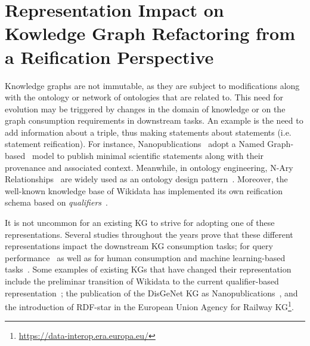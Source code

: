 

\chapter{Representation Impact on Kowledge Graph Refactoring from a Reification Perspective}
\label{chapter:evolution}

Knowledge graphs are not immutable, as they are subject to modifications along with the ontology or network of ontologies that are related to. This need for evolution may be triggered by changes in the domain of knowledge or on the graph consumption requirements in downstream tasks. 
An example is the need to add information about a triple, thus making statements about statements (i.e. statement reification).
For instance, Nanopublications~\parencite{groth2010nanopubs} adopt a Named Graph-based~\parencite{carroll2005namedgraphs} model to publish minimal scientific statements along with their provenance and associated context. Meanwhile, in ontology engineering, N-Ary Relationships~\parencite{naryw3c2006} are widely used as an ontology design pattern~\parencite{gangemi2013multi}. Moreover, the well-known knowledge base of Wikidata has implemented its own reification schema based on \textit{qualifiers}~\parencite{erxleben2014introducing}. 

It is not uncommon for an existing KG to strive for adopting one of these representations. Several studies throughout the years prove that these different representations impact the downstream KG consumption tasks; for query performance~\parencite{das2014tale,nguyen2014don,alocci2015property,hernandez2015reifying,frey2019evaluation,orlandi2021benchmarking} as well as for human consumption and machine learning-based tasks~\parencite{iglesias2023kgconsumption}. Some examples of existing KGs that have changed their representation include the preliminar transition of Wikidata to the current qualifier-based representation~\parencite{erxleben2014introducing}; the publication of the DisGeNet KG as Nanopublications~\parencite{queralt2016disgenet}, and the introduction of RDF-star in the European Union Agency for Railway  KG\footnote{\url{https://data-interop.era.europa.eu/}}.


